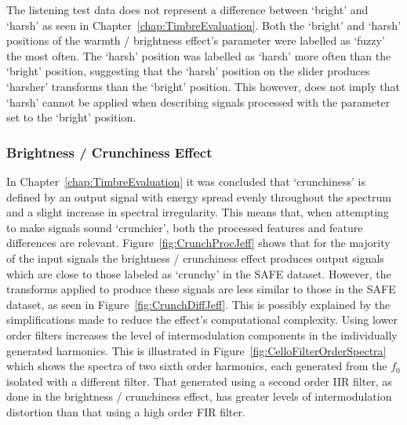			The listening test data does not represent a difference between `bright' and `harsh' as seen in
			Chapter~\ref{chap:TimbreEvaluation}. Both the `bright' and `harsh' positions of the warmth /
			brightness effect's parameter were labelled as `fuzzy' the most often. The `harsh' position was
			labelled as `harsh' more often than the `bright' position, suggesting that the `harsh' position on
			the slider produces `harsher' transforms than the `bright' position. This however, does not imply
			that `harsh' cannot be applied when describing signals processed with the parameter set to the
			`bright' position.
			
		\subsubsection*{Brightness / Crunchiness Effect}
			In Chapter~\ref{chap:TimbreEvaluation} it was concluded that `crunchiness' is defined by an output
			signal with energy spread evenly throughout the spectrum and a slight increase in spectral
			irregularity. This means that, when attempting to make signals sound `crunchier', both the
			processed features and feature differences are relevant.  Figure~\ref{fig:CrunchProcJeff} shows
			that for the majority of the input signals the brightness / crunchiness effect produces output
			signals which are close to those labeled as `crunchy' in the SAFE dataset. However, the transforms
			applied to produce these signals are less similar to those in the SAFE dataset, as seen in
			Figure~\ref{fig:CrunchDiffJeff}. This is possibly explained by the simplifications made to reduce
			the effect's computational complexity. Using lower order filters increases the level of
			intermodulation components in the individually generated harmonics. This is illustrated in
			Figure~\ref{fig:CelloFilterOrderSpectra} which shows the spectra of two sixth order harmonics, each
			generated from the $f_{0}$ isolated with a different filter. That generated using a second order
			IIR filter, as done in the brightness / crunchiness effect, has greater levels of intermodulation
			distortion than that using a high order FIR filter. 
			
